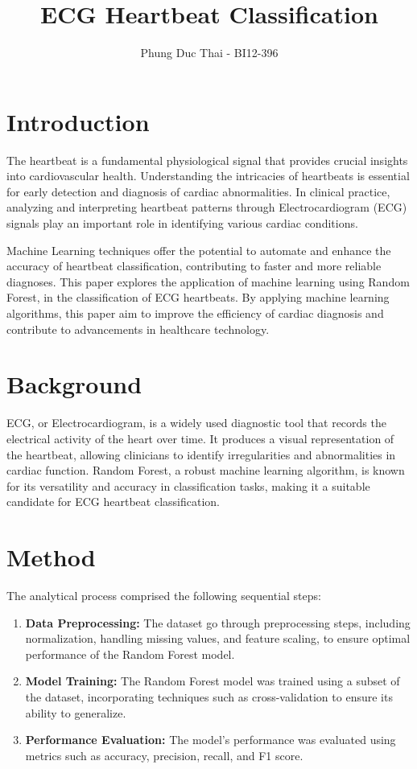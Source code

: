 \documentclass[conference]{IEEEtran}
\title{ECG Heartbeat Classification}
\author{Phung Duc Thai - BI12-396}
\begin{document}
\maketitle

\section{Introduction}

The heartbeat is a fundamental physiological signal that provides crucial insights into cardiovascular health. Understanding the intricacies of heartbeats is essential for early detection and diagnosis of cardiac abnormalities. In clinical practice, analyzing and interpreting heartbeat patterns through Electrocardiogram (ECG) signals play an important role in identifying various cardiac conditions.

Machine Learning techniques offer the potential to automate and enhance the accuracy of heartbeat classification, contributing to faster and more reliable diagnoses. This paper explores the application of machine learning using Random Forest, in the classification of ECG heartbeats. By applying machine learning algorithms, this paper aim to improve the efficiency of cardiac diagnosis and contribute to advancements in healthcare technology.

\section{Background}

ECG, or Electrocardiogram, is a widely used diagnostic tool that records the electrical activity of the heart over time. It produces a visual representation of the heartbeat, allowing clinicians to identify irregularities and abnormalities in cardiac function. Random Forest, a robust machine learning algorithm, is known for its versatility and accuracy in classification tasks, making it a suitable candidate for ECG heartbeat classification.

\section{Method}

The analytical process comprised the following sequential steps:

\begin{enumerate}
    \item \textbf{Data Preprocessing:} The dataset go through preprocessing steps, including normalization, handling missing values, and feature scaling, to ensure optimal performance of the Random Forest model.
    
    \item \textbf{Model Training:} The Random Forest model was trained using a subset of the dataset, incorporating techniques such as cross-validation to ensure its ability to generalize.
    
    \item \textbf{Performance Evaluation:} The model's performance was evaluated using metrics such as accuracy, precision, recall, and F1 score. 
\end{enumerate}
\end{document}

